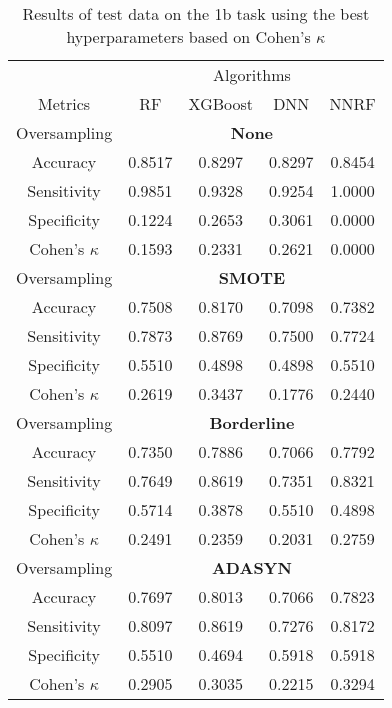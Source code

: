 \begin{table}[!htb]
\centering
\caption{Results of test data on the 1b task using the best hyperparameters based on Cohen's $\kappa$}
\label{tab:1b_test_results}
\begin{tabular}{c | c c c c}
\hline
 & \multicolumn{4}{c}{Algorithms}\\ 
Metrics &RF & XGBoost & DNN & NNRF\\ 
\hline
Oversampling &\multicolumn{4}{|c}{\textbf{None}}\\ 
\hline
Accuracy & 0.8517 & 0.8297 & 0.8297 & 0.8454\\ 
Sensitivity & 0.9851 & 0.9328 & 0.9254 & 1.0000\\ 
Specificity & 0.1224 & 0.2653 & 0.3061 & 0.0000\\ 
Cohen's $\kappa$ & 0.1593 & 0.2331 & 0.2621 & 0.0000\\ 
\hline
Oversampling &\multicolumn{4}{|c}{\textbf{SMOTE}}\\ 
\hline
Accuracy & 0.7508 & 0.8170 & 0.7098 & 0.7382\\ 
Sensitivity & 0.7873 & 0.8769 & 0.7500 & 0.7724\\ 
Specificity & 0.5510 & 0.4898 & 0.4898 & 0.5510\\ 
Cohen's $\kappa$ & 0.2619 & 0.3437 & 0.1776 & 0.2440\\ 
\hline
Oversampling &\multicolumn{4}{|c}{\textbf{Borderline}}\\ 
\hline
Accuracy & 0.7350 & 0.7886 & 0.7066 & 0.7792\\ 
Sensitivity & 0.7649 & 0.8619 & 0.7351 & 0.8321\\ 
Specificity & 0.5714 & 0.3878 & 0.5510 & 0.4898\\ 
Cohen's $\kappa$ & 0.2491 & 0.2359 & 0.2031 & 0.2759\\ 
\hline
Oversampling &\multicolumn{4}{|c}{\textbf{ADASYN}}\\ 
\hline
Accuracy & 0.7697 & 0.8013 & 0.7066 & 0.7823\\ 
Sensitivity & 0.8097 & 0.8619 & 0.7276 & 0.8172\\ 
Specificity & 0.5510 & 0.4694 & 0.5918 & 0.5918\\ 
Cohen's $\kappa$ & 0.2905 & 0.3035 & 0.2215 & 0.3294\\ 
\hline
\end{tabular}
\end{table}


